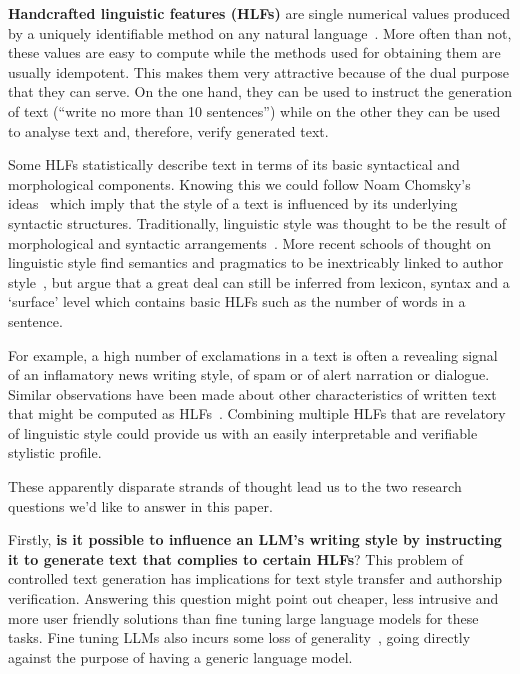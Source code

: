 \documentclass[runningheads,a4paper,11pt]{article}
\begin{document}
\textbf{Handcrafted linguistic features (HLFs)} are single numerical values
produced by a uniquely identifiable method on any natural
language~\cite{lftk-2023}.
More often than not, these values are easy to compute while the methods used for
obtaining them are usually idempotent.
This makes them very attractive because of the dual purpose that they can serve.
On the one hand, they can be used to instruct the generation of text (``write
no more than 10 sentences'') while on the other they can be used to analyse text
and, therefore, verify generated text.

Some HLFs statistically describe text in terms of its basic syntactical and
morphological components.
Knowing this we could follow Noam Chomsky's ideas~\cite{chomsky2002syntactic}
which imply that the style of a text is influenced by its underlying syntactic
structures.
Traditionally, linguistic style was thought to be the result of morphological
and syntactic arrangements~\cite{lugea2023stylistics}.
More recent schools of thought on linguistic style find semantics and pragmatics
to be inextricably linked to author style~\cite{verma2019lexical}, but argue
that a great deal can still be inferred from lexicon, syntax and a `surface'
level which contains basic HLFs such as the number of words in a sentence.

For example, a high number of exclamations in a text is often a revealing
signal of an inflamatory news writing style, of spam or of alert narration or
dialogue.
Similar observations have been made about other characteristics of written text
that might be computed as HLFs~\cite{hovy1987generating,lugea2023stylistics}.
Combining multiple HLFs that are revelatory of linguistic style could provide us
with an easily interpretable and verifiable stylistic profile.

These apparently disparate strands of thought lead us to the two research
questions we'd like to answer in this paper.

Firstly, \textbf{is it possible to influence an LLM's writing style by
    instructing it to generate text that complies to certain HLFs}?
This problem of controlled text generation has implications for text style
transfer and authorship verification.
Answering this question might point out cheaper, less intrusive and more user
friendly solutions than fine tuning large language models for these tasks.
Fine tuning LLMs also incurs some loss of generality~\cite{yang2024unveiling},
going directly against the purpose of having a generic language model.
\end{document}
